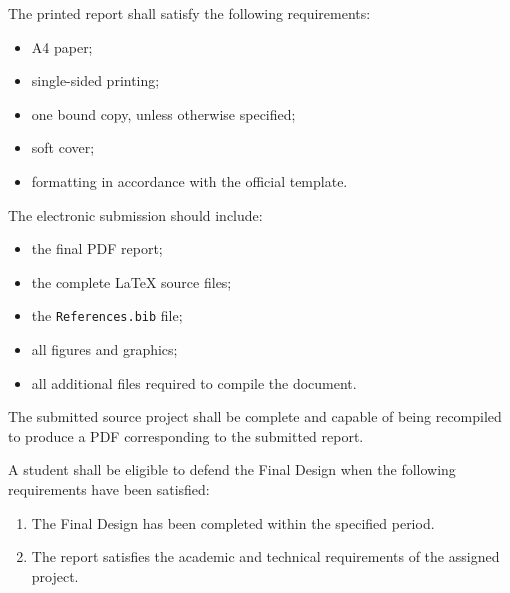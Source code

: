 {

The printed report shall satisfy the following requirements:

\begin{itemize}[leftmargin=0.8cm, itemsep=2pt]
    \item A4 paper;
    \item single-sided printing;
    \item one bound copy, unless otherwise specified;
    \item soft cover;
    \item formatting in accordance with the official template.
\end{itemize}

The electronic submission should include:

\begin{itemize}[leftmargin=0.8cm, itemsep=2pt]
    \item the final PDF report;
    \item the complete \LaTeX{} source files;
    \item the \verb|References.bib| file;
    \item all figures and graphics;
    \item all additional files required to compile the document.
\end{itemize}

The submitted source project shall be complete and capable of being
recompiled to produce a PDF corresponding to the submitted report.

\vspace{0.3cm}



A student shall be eligible to defend the Final Design when the
following requirements have been satisfied:

\begin{enumerate}[label=\arabic*., leftmargin=1.2cm, itemsep=2pt]

    \item The Final Design has been completed within the specified
    period.

    \item The report satisfies the academic and technical requirements
    of the assigned project.


\end{enumerate}}
